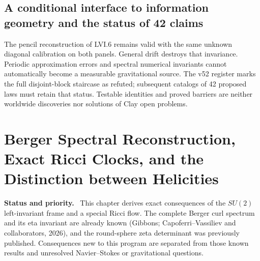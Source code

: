 \documentclass[11pt,a4paper,oneside]{book}
\newcommand{\note}[1]{\par\medskip\noindent\textbf{#1}\ }
\begin{document}
\section{A conditional interface to information geometry and the status of 42 claims}
The pencil reconstruction of LVI.6 remains valid with the same unknown diagonal calibration on both panels. General drift destroys that invariance. Periodic approximation errors and spectral numerical invariants cannot automatically become a measurable gravitational source. The v52 register marks the full disjoint-block staircase as refuted; subsequent catalogs of 42 proposed laws must retain that status. Testable identities and proved barriers are neither worldwide discoveries nor solutions of Clay open problems.

\chapter{Berger Spectral Reconstruction, Exact Ricci Clocks, and the Distinction between Helicities}
\note{Status and priority.} This chapter derives exact consequences of the $SU(2)$ left-invariant frame and a special Ricci flow. The complete Berger curl spectrum and its eta invariant are already known (Gibbons; Capoferri--Vassiliev and collaborators, 2026), and the round-sphere zeta determinant was previously published. Consequences new to this program are separated from those known results and unresolved Navier--Stokes or gravitational questions.
\end{document}

